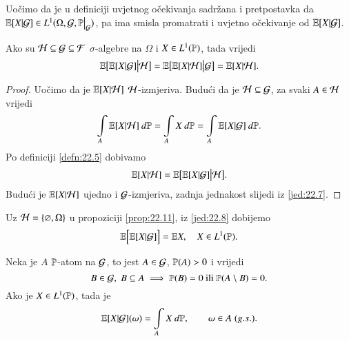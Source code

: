 Uo\v cimo da je u definiciji uvjetnog o\v cekivanja sadr\v zana i pretpostavka da $\masE [X | \famG] \in L^1 (\Omega, \famG, \restr{\masP}{\famG})$, pa ima smisla promatrati i uvjetno o\v cekivanje od $\mathbb{E} [X | \mathcal{G}]$.

\begin{prop}    \label{prop:22.11}
    Ako su $\mathcal{H} \subseteq \mathcal{G} \subseteq \mathcal{F}$ $\sigma$-algebre na $\Omega$ i $X \in L^1 (\mathbb{P})$, tada vrijedi
    \begin{equation*}
        \mathbb{E} \big[ \mathbb{E} [X | \mathcal{G}] \big| \mathcal{H} \big] = \mathbb{E} \big[ \mathbb{E} [X | \mathcal{H}] \big| \mathcal{G} \big] = \mathbb{E} [X | \mathcal{H}].
    \end{equation*}
\end{prop}

\begin{proof}
    Uo\v cimo da je $\mathbb{E} [X | \mathcal{H}]$ $\mathcal{H}$-izmjeriva.
    Budu\' ci da je $\mathcal{H} \subseteq \mathcal{G}$, za svaki $A \in \mathcal{H}$ vrijedi
    \begin{equation*}
        \int\limits_A \mathbb{E} [X | \mathcal{H}] \: d \mathbb{P} = \int\limits_A X \: d \mathbb{P} = \int\limits_A \mathbb{E} [X | \mathcal{G}] \: d \mathbb{P}.
    \end{equation*}
    Po definiciji \ref{defn:22.5} dobivamo
    \begin{equation*}
        \mathbb{E} [X | \mathcal{H}] = \mathbb{E} \big[ \mathbb{E} [X | \mathcal{G}] \big| \mathcal{H} \big].
    \end{equation*}
    Budu\' ci je $\mathbb{E} [X | \mathcal{H}]$ ujedno i $\mathcal{G}$-izmjeriva, zadnja jednakost slijedi iz \eqref{jed:22.7}.
\end{proof}

Uz $\mathcal{H} = \{ \varnothing, \Omega\}$ u propoziciji \ref{prop:22.11}, iz \eqref{jed:22.8} dobijemo
\begin{equation}    \label{jedn:22.12}
    \mathbb{E} \Big[ \mathbb{E} [X | \mathcal{G}] \Big] = \mathbb{E} X, \quad X \in L^1 (\mathbb{P}).
\end{equation}

\begin{zad} \label{zad:22.13}
    Neka je $A$ $\mathbb{P}$-atom na $\mathcal{G}$, to jest $A \in \mathcal{G}$, $\mathbb{P} (A) > 0$ i vrijedi
    \begin{equation*}
        B \in \mathcal{G}, \; B \subseteq A \implies \mathbb{P} (B) = 0 \textnormal{ ili } \mathbb{P} (A \setminus B) = 0.
    \end{equation*}
    Ako je $X \in L^1 (\mathbb{P})$, tada je
    \begin{equation*}
        \mathbb{E} [X | \mathcal{G}] (\omega) = \int\limits_A X \: d \mathbb{P}, \quad \quad \omega \in A \; (g.s.).
    \end{equation*}
\end{zad}